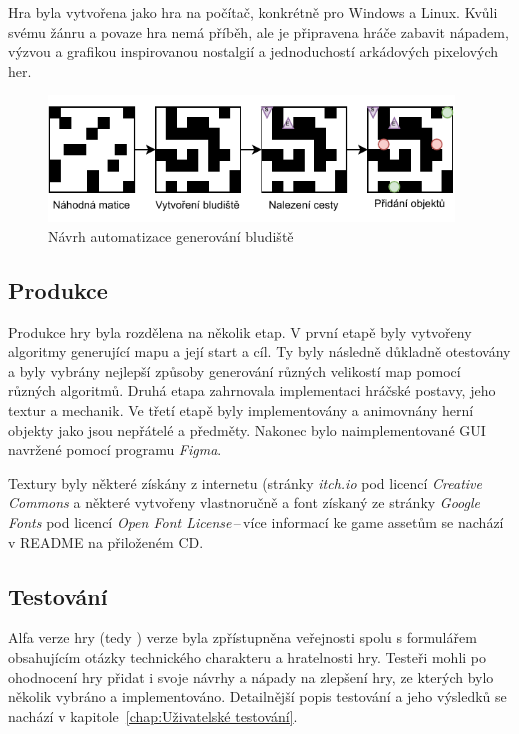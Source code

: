 Hra byla vytvořena jako hra na počítač, konkrétně pro Windows a Linux. Kvůli svému žánru a povaze hra nemá příběh, ale je připravena hráče zabavit nápadem, výzvou a grafikou inspirovanou nostalgií a jednoduchostí arkádových pixelových her.

\begin{figure}[t]
    \centering
    \includegraphics[width=0.96\textwidth]{obrazky-figures/ch3/navrh_generovani.pdf}
    \caption{Návrh automatizace generování bludiště}
    \label{fig:navrh_generovani}
\end{figure}

\subsection*{Produkce}
Produkce hry byla rozdělena na několik etap. V první etapě byly vytvořeny algoritmy generující mapu a její start a cíl. Ty byly následně důkladně otestovány a byly vybrány nejlepší způsoby generování různých velikostí map pomocí různých algoritmů. Druhá etapa zahrnovala implementaci hráčské postavy, jeho textur a mechanik. Ve třetí etapě byly implementovány a animovnány herní objekty jako jsou nepřátelé a předměty. Nakonec bylo naimplementované GUI navržené pomocí programu \textit{Figma}.

Textury byly některé získány z internetu (stránky \textit{itch.io} pod licencí \textit{Creative Commons} a některé vytvořeny vlastnoručně a font získaný ze stránky \textit{Google Fonts} pod licencí \textit{Open Font License}\,--\,více informací ke game assetům se nachází v README na přiloženém CD.

\subsection*{Testování}
Alfa verze hry (tedy ) verze byla zpřístupněna veřejnosti spolu s formulářem obsahujícím otázky technického charakteru a hratelnosti hry. Testeři mohli po ohodnocení hry přidat i svoje návrhy a nápady na zlepšení hry, ze kterých bylo několik vybráno a implementováno. Detailnější popis testování a jeho výsledků se nachází v kapitole~\ref{chap:Uživatelské testování}.


